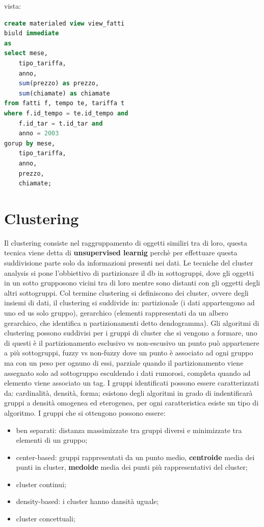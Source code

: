 \documentclass[12pt]{article}
\begin{document}
vista:
\begin{lstlisting}[language=sql]
create materialed view view_fatti
biuld immediate
as
select mese,
    tipo_tariffa,
    anno,
    sum(prezzo) as prezzo,
    sum(chiamate) as chiamate
from fatti f, tempo te, tariffa t
where f.id_tempo = te.id_tempo and
    f.id_tar = t.id_tar and
    anno = 2003
gorup by mese,
    tipo_tariffa,
    anno,
    prezzo,
    chiamate;
\end{lstlisting}



\newpage
\section{Clustering}
Il clustering consiste nel raggruppamento di oggetti similiri tra di loro, questa tecnica viene detta di \textbf{unsupervised learnig} perch\`e per effettuare questa suddivisione parte solo da informazioni presenti nei dati. Le tecniche del cluster analysis si pone l'obbiettivo di partizionare il db in sottogruppi, dove gli oggetti in un sotto grupposono vicini tra di loro mentre sono distanti con gli oggetti degli altri sottogruppi. Col termine clustering si definiscono dei cluster, ovvere degli insiemi di dati, il clustering si suddivide in: partizionale (i dati appartengono ad uno ed us solo gruppo), gerarchico (elementi rappresentati da un albero gerarchico, che identifica n partizionamenti detto dendogramma). Gli algoritmi di clustering possono suddivisi per i gruppi di cluster che si vengono a formare, uno di questi \`e il partizionamento esclusivo vs non-escusivo un punto pu\`o appartenere a pi\`u sottogruppi, fuzzy vs non-fuzzy dove un punto \`e associato ad ogni gruppo ma con un peso per ognuno di essi, parziale quando il partizionamento viene assegnato solo ad sottogruppo esculdendo i dati rumorosi, completa quando ad elemento viene associato un tag. I gruppi identificati possono essere caratterizzati da: cardinalit\`a, densit\`a, forma; esistono degli algoritmi in grado di indentificar\`a gruppi a densit\`a omogenea ed eterogenea, per ogni caratteristica esiste un tipo di algoritmo. I gruppi che si ottengono possono essere:
\begin{itemize}
    \item ben separati: distanza massimizzate tra gruppi diversi e minimizzate tra elementi di un gruppo;
    \item center-based: gruppi rappresentati da un punto medio, \textbf{centroide} media dei punti in cluster, \textbf{medoide} media dei punti pi\`u rappresentativi del cluster;
    \item cluster continui;
    \item density-based: i cluster hanno dansit\`a uguale;
    \item cluster concettuali;
\end{itemize}
\end{document}
